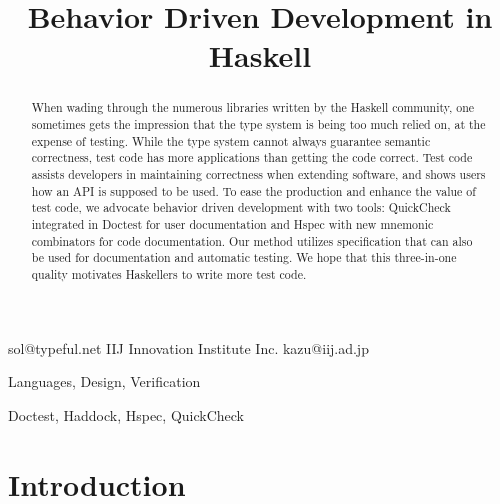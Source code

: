 \documentclass[preprint]{sigplanconf}
\begin{document}
\copyrightdata{[to be supplied]}


\title{Behavior Driven Development in Haskell}

           {}
           {sol@typeful.net}
           {IIJ Innovation Institute Inc.}
           {kazu@iij.ad.jp}

\maketitle

\begin{abstract}

When wading through the numerous libraries written by
the Haskell community, one sometimes gets the impression that the type
system is being too much relied on, at the expense of testing.
While the type system cannot always guarantee semantic correctness,
test code has more applications than getting the code correct.
Test code assists developers in maintaining correctness when extending
software, and shows users how an API is supposed to be used.
To ease the production and enhance the value of test code, we advocate
behavior driven development with two tools:
QuickCheck integrated in Doctest for user documentation and Hspec
with new mnemonic combinators for code documentation.
Our method utilizes specification that can also be used for
documentation and automatic testing. We hope that this three-in-one
quality motivates Haskellers to write more test code.


\end{abstract}


\terms Languages, Design, Verification

\keywords Doctest, Haddock, Hspec, QuickCheck

\section{Introduction}
\end{document}
